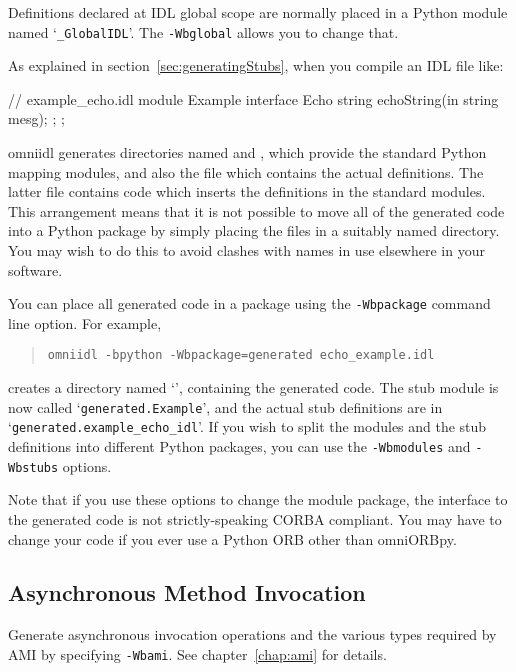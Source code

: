 \documentclass[11pt,oneside,a4paper]{book}
\newcommand{\module}[1]{\texttt{#1}}
\newcommand{\cmdline}[1]{\texttt{#1}}
\begin{document}
Definitions declared at IDL global scope are normally placed in a
Python module named `\module{\_GlobalIDL}'. The \cmdline{-Wbglobal}
allows you to change that.

As explained in section~\ref{sec:generatingStubs}, when you compile an
IDL file like:

\begin{idllisting}
// example_echo.idl
module Example {
  interface Echo {
    string echoString(in string mesg);
  };
};
\end{idllisting}

\noindent omniidl generates directories named  and
, which provide the standard Python mapping
modules, and also the file  which contains
the actual definitions. The latter file contains code which inserts
the definitions in the standard modules. This arrangement means that
it is not possible to move all of the generated code into a Python
package by simply placing the files in a suitably named directory.
You may wish to do this to avoid clashes with names in use elsewhere
in your software.

You can place all generated code in a package using the
\cmdline{-Wbpackage} command line option. For example,

\begin{quote}
\cmdline{omniidl -bpython -Wbpackage=generated echo\_example.idl}
\end{quote}

\noindent creates a directory named `', containing the
generated code. The stub module is now called
`\module{generated.Example}', and the actual stub definitions are in
`\module{generated.example\_echo\_idl}'. If you wish to split the
modules and the stub definitions into different Python packages, you
can use the \cmdline{-Wbmodules} and \cmdline{-Wbstubs} options.

Note that if you use these options to change the module package, the
interface to the generated code is not strictly-speaking CORBA
compliant. You may have to change your code if you ever use a Python
ORB other than omniORBpy.


\subsection{Asynchronous Method Invocation}

Generate asynchronous invocation operations and the various types
required by AMI by specifying \cmdline{-Wbami}. See
chapter~\ref{chap:ami} for details.
\end{document}

